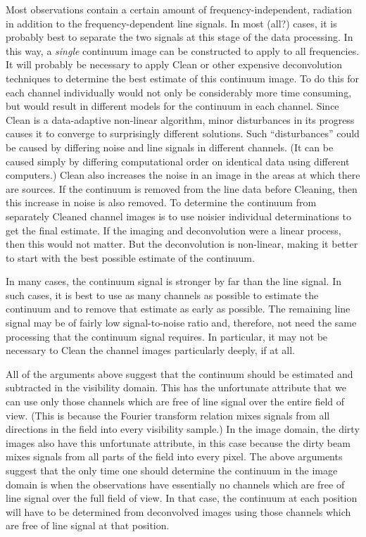 \vfill\eject
{}

     Most  observations contain a certain amount
of frequency-independent,  radiation in addition to
the frequency-dependent line signals.  In most (all?) cases, it is
probably best to separate the two signals at this stage of the data
processing.  In this way, a {\it single\/} continuum image can be
constructed to apply to all frequencies.  It will probably be
necessary to apply Clean or other expensive deconvolution techniques
to determine the best estimate of this continuum image.  To do this
for each channel individually would not only be considerably more time
consuming, but would result in different models for the continuum in
each channel.  Since Clean is a data-adaptive non-linear algorithm,
minor disturbances in its progress causes it to converge to
surprisingly different solutions.  Such ``disturbances'' could be
caused by differing noise and line signals in different channels.  (It
can be caused simply by differing computational order on identical
data using different computers.)  Clean also increases the noise in an
image in the areas at which there are sources.  If the continuum is
removed from the line data before Cleaning, then this increase in
noise is also removed.  To determine the continuum from separately
Cleaned channel images is to use noisier individual determinations to
get the final estimate.  If the imaging and deconvolution were a
linear process, then this would not matter.  But the deconvolution is
non-linear, making it better to start with the best possible estimate
of the continuum.

     In many cases, the continuum signal is stronger by far than the
line signal.  In such cases, it is best to use as many channels as
possible to estimate the continuum and to remove that estimate as
early as possible.  The remaining line signal may be of fairly low
signal-to-noise ratio and, therefore, not need the same processing
that the continuum signal requires.  In particular, it may not be
necessary to Clean the channel images particularly deeply, if at all.

     All of the arguments above suggest that the continuum should be
estimated and subtracted in the visibility domain.  This has the
unfortunate attribute that we can use only those channels which are
free of line signal over the entire field of view.  (This is because
the Fourier transform relation mixes signals from all directions in
the field into every visibility sample.)  In the image domain, the
dirty images also have this unfortunate attribute, in this case
because the dirty beam mixes signals from all parts of the field into
every pixel.  The above arguments suggest that the only time one
should determine the continuum in the image domain is when the
observations have essentially no channels which are free of line
signal over the full field of view.  In that case, the continuum at
each position will have to be determined from deconvolved images using
those channels which are free of line signal at that position.

